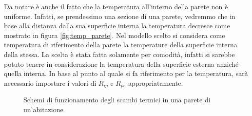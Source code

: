 \documentclass[laurea,oneside,11pt]{USiena_tesiLM}
\begin{document}
Da notare è anche il fatto che la temperatura all'interno della parete non è uniforme. Infatti, se prendessimo una sezione di una parete, vedremmo che in base alla distanza dalla sua superficie interna la temperatura decresce come mostrato in figura \ref{fig:temp_parete}.  Nel modello scelto si considera come temperatura di riferimento della parete la temperature della superficie interna della stessa. La scelta è stata fatta solamente per comodità, infatti si sarebbe potuto tenere in considerazione la temperatura della superficie esterna anziché quella interna. In base al punto al quale si fa riferimento per la temperatura, sarà necessario impostare  i valori di $R_{ip}$ e $R_{pe}$ appropriatamente.   

 \begin{figure}[!ht]
 \centering
 \hspace{5mm}
 \caption{Schemi di funzionamento degli scambi termici in una parete di un'abitazione}
 \end{figure}
\end{document}

